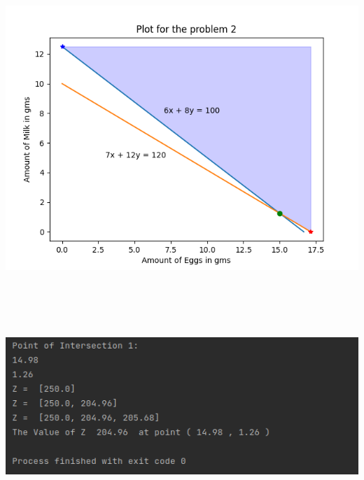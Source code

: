 \documentclass[12pt, letterpaper, twoside]{book}
\begin{document}
\begin{center}
\includegraphics[height=400pt]{Plot2}
\end{center}
\begin{flushleft}
\includegraphics[width=\paperwidth]{Output2}
\end{flushleft}
\end{document}
